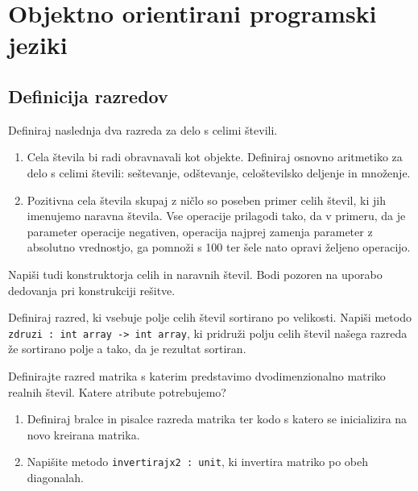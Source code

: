 \chapter{Objektno orientirani programski jeziki}



\section{Definicija razredov}



\begin{ex}
Definiraj naslednja dva razreda za delo s celimi \v stevili.

\begin{enumerate}
\item
Cela \v stevila bi radi obravnavali kot objekte. Definiraj osnovno aritmetiko za delo s celimi \v stevili: se\v stevanje, od\v stevanje, celo\v stevilsko deljenje in mno\v zenje.
\item
Pozitivna cela \v stevila skupaj z ni\v clo so poseben primer celih \v stevil, ki jih imenujemo naravna \v stevila. Vse operacije prilagodi tako, da v primeru, da je parameter operacije negativen, operacija najprej zamenja parameter z absolutno vrednostjo, ga pomno\v zi s 100 ter \v sele nato opravi \v zeljeno operacijo.
\end{enumerate}
Napi\v si tudi konstruktorja celih in naravnih \v stevil. Bodi pozoren na uporabo dedovanja pri konstrukciji re\v sitve.
\end{ex}





\begin{ex}
Definiraj razred, ki vsebuje polje celih \v stevil sortirano po velikosti. Napi\v si metodo \lstinline{zdruzi : int array -> int array}, ki pridru\v zi polju celih \v stevil na\v sega razreda \v ze sortirano polje a tako, da je rezultat sortiran.
\end{ex}




\begin{ex}
Definirajte razred matrika s katerim predstavimo dvodimenzionalno matriko realnih \v stevil. Katere atribute potrebujemo?
\begin{enumerate}
\item Definiraj bralce in pisalce razreda matrika ter kodo s katero se inicializira na novo kreirana matrika.
\item Napi\v site metodo \lstinline{invertirajx2 : unit}, ki invertira matriko po obeh diagonalah.
\end{enumerate}
\end{ex}





